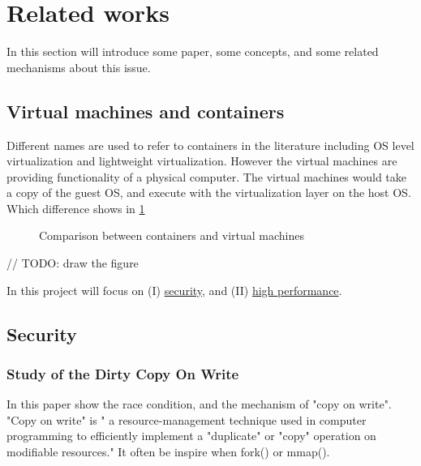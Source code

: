 \documentclass[12pt,a4paper]{IEEEconf}
\begin{document}

\section{Related works}
In this section will introduce some paper, some concepts, and some related mechanisms
about this issue.
\subsection{Virtual machines and containers}
Different names are used to refer to containers in the literature including OS level
virtualization and lightweight virtualization\cite{Road_Ahead}. However the virtual
machines are providing functionality of a physical computer. The virtual machines
would take a copy of the guest OS, and execute with the virtualization layer on
the host OS. Which difference shows in \ref*{VM_cont}
\begin{figure}
  \centering
  \caption[]{Comparison between containers and virtual machines}
  \label{VM_cont}
\end{figure}
// TODO: draw the figure


In this project will focus on (\RN{1}) \hyperlink{security}{security}, and (\RN{2})
\hyperlink{heigh_performance}{high performance}.

\hypertarget{security}{\subsection{Security}}
\subsubsection{Study of the Dirty Copy On Write}
In this paper\cite{Study_Dirty_Cow} show the race condition, and the mechanism of
"copy on write". "Copy on write" is " a resource-management technique used in
computer programming to efficiently implement a "duplicate" or "copy" operation
on modifiable resources." \cite{CoW_wiki} It often be inspire when fork() or mmap().
\end{document}
